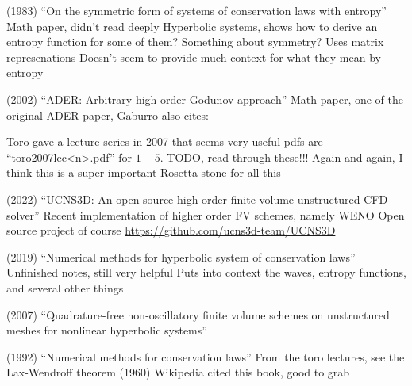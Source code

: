 \begin{outline}
  \1 (1983) ``On the symmetric form of systems of conservation laws with entropy'' \cite{harten1983symmetric}
  \2 Math paper, didn't read deeply
  \2 Hyperbolic systems, shows how to derive an entropy function for some of them? Something about symmetry? Uses matrix represenations
  \2 Doesn't seem to provide much context for what they mean by entropy

  \1 (2002) ``ADER: Arbitrary high order Godunov approach'' \cite{titarev2002ader}
  \2 Math paper, one of the original ADER paper, Gaburro also cites:

  \1 Toro gave a lecture series in 2007 that seems very useful \cite{toro2007lec} 
  \2 pdfs are ``toro2007lec<n>.pdf'' for $1-5$.
  \2 TODO, read through these!!! Again and again, I think this is a super important Rosetta stone for all this

\1 (2022) ``UCNS3D: An open-source high-order finite-volume unstructured CFD solver'' \cite{antoniadis2022ucns3d}
\2 Recent implementation of higher order FV schemes, namely WENO 
\2 Open source project of course \url{https://github.com/ucns3d-team/UCNS3D}

\1 (2019) ``Numerical methods for hyperbolic system of conservation laws'' \cite{chandrashekar2019num}
\2 Unfinished notes, still very helpful
\2 Puts into context the waves, entropy functions, and several other things

\1 (2007) ``Quadrature-free non-oscillatory finite volume schemes on unstructured meshes for nonlinear hyperbolic systems'' \cite{dumbser2007quadrature}

\1 (1992) ``Numerical methods for conservation laws''  \cite{leveque1992numerical}
\2 From the toro lectures, see the Lax-Wendroff theorem (1960)
\2 Wikipedia cited this book, good to grab

\end{outline}


